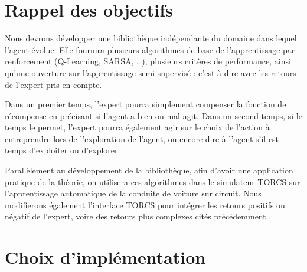 \documentclass[a4paper,12pt]{article}
\begin{document}
  \begin{titlepage}
   \def\titletype{Manuel du programmeur}
   
  \end{titlepage}

  
  \clearpage

  \tableofcontents
  

  \clearpage
  
  \renewcommand{\labelitemi}{$\bullet$}
  \renewcommand{\labelitemii}{$\circ$}
  \renewcommand{\labelitemiii}{$\diamond$}
  \renewcommand{\labelitemiv}{$\ast$}
  
  \section{Rappel des objectifs}

	Nous devrons développer une bibliothèque indépendante du domaine dans lequel l'agent évolue. 
	Elle fournira plusieurs algorithmes de base de l'apprentissage par renforcement  (Q-Learning, SARSA, …), 
	plusieurs critères de performance, ainsi qu'une ouverture sur l'apprentissage semi-supervisé : 
	c'est à dire avec les retours de l'expert pris en compte. 
	
	Dans un premier temps, l'expert pourra simplement compenser la fonction de récompense en précisant si 
	l'agent a bien ou mal agit. Dans un second temps, si le temps le permet, l'expert pourra également agir 
	sur le choix de l'action à entreprendre lors de l'exploration de l'agent, ou encore dire à l'agent s'il 
	est temps d'exploiter ou d'explorer.
	
	Parallèlement au développement de la bibliothèque, afin d'avoir une application pratique de la théorie,
	on utilisera ces algorithmes dans le simulateur TORCS sur l'apprentissage automatique de la conduite de 
	voiture sur circuit. Nous modifierons également l'interface TORCS pour intégrer les retours positifs ou 
	négatif de l'expert, voire des retours plus complexes cités précédemment \cite{CdC}.
 
 
 \section{Choix d’implémentation}
 
\end{document}
